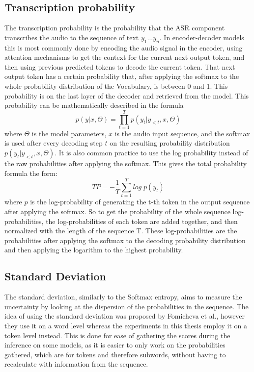 \subsection{Transcription probability}
The transcription probability is the probability that the ASR component transcribes the audio to the sequence of text $y_1\dots y_n$. 
In encoder-decoder models this is most commonly done by encoding the audio signal in the encoder, using attention mechanisms to get the context for the current next output token, and then using previous predicted tokens to decode the current token. 
That next output token has a certain probability that, after applying the softmax to the whole probability distribution of the Vocabulary, is between 0 and 1. This probability is on the last layer of the decoder and retrieved from the model. 
This probability can be mathematically described in the formula $$p(y|x,\Theta)=\prod_{t=1}^T p(y_t|y_{<t}, x, \Theta) $$ where $\Theta$ is the model parameters, $x$ is the audio input sequence, and the softmax is used after every decoding step $t$ on the resulting probability distribution $p(y_t|y_{<t}, x,\Theta)$. 
It is also common practice to use the log probability instead of the raw probabilities after applying the softmax. This gives the total probability formula the form: $$TP=-\frac{1}{T}\sum_{t=1}^T log\; p(y_t) \label{formula:transcriptionProbability}$$
where $p$ is the log-probability of generating the t-th token in the output sequence after applying the softmax. So to get the probability of the whole sequence log-probabilities, the log-probabilities of each token are added together, and then normalized with the length of the sequence T. 
These log-probabilities are the probabilities after applying the softmax to the decoding probability distribution and then applying the logarithm to the highest probability.


\subsection{Standard Deviation}\label{sect:stddiv}
The standard deviation, similarly to the Softmax entropy, aims to measure the uncertainty by looking at the dispersion of the probabilities in the sequence. 
The idea of using the standard deviation was proposed by Fomicheva et al., however they use it on a word level whereas the experiments in this thesis employ it on a token level instead. 
This is done for ease of gathering the scores during the inference on some models, as it is easier to only work on the probabilities gathered, which are for tokens and therefore subwords, without having to recalculate with information from the sequence. 

